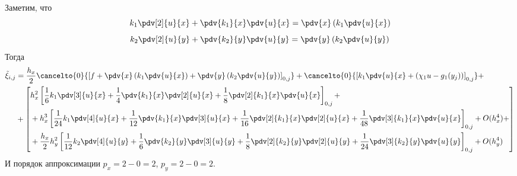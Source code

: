 Заметим, что
\[ k_1 \pdv[2]{u}{x} + \pdv{k_1}{x} \pdv{u}{x} = \pdv{x} \left( k_1 \pdv{u}{x} \right) \]
\[ k_2 \pdv[2]{u}{y} + \pdv{k_2}{y} \pdv{u}{y} = \pdv{y} \left( k_2 \pdv{u}{y} \right) \]
Тогда
\[
    \begin{split}
        \tilde{\xi}_{i,j} &= \frac{h_x}{2} \cancelto{0}{\left[ f + \pdv{x} \left( k_1 \pdv{u}{x} \right) + \pdv{y} \left( k_2 \pdv{u}{y} \right) \right]_{0,j}} + \cancelto{0}{\left[ k_1 \pdv{u}{x} + \left( \chi_1 u - g_1(y_{j}) \right) \right]_{0,j}} + \\
        &+ \left[
        \begin{aligned}
            & h_x^2 \left[ \frac{1}{6} k_1 \pdv[3]{u}{x} + \frac{1}{4} \pdv{k_1}{x} \pdv[2]{u}{x} + \frac{1}{8} \pdv[2]{k_1}{x} \pdv{u}{x} \right]_{0,j} + \\
            & + h_x^3 \left[ \frac{1}{24} k_1 \pdv[4]{u}{x} + \frac{1}{12} \pdv{k_1}{x} \pdv[3]{u}{x} + \frac{1}{16} \pdv[2]{k_1}{x} \pdv[2]{u}{x} + \frac{1}{48} \pdv[3]{k_1}{x} \pdv{u}{x} \right]_{0,j} + O(h_x^4) + \\
            & + \frac{h_x}{2} h_y^2 \left[ \frac{1}{12} k_2 \pdv[4]{u}{y} + \frac{1}{6} \pdv{k_2}{y} \pdv[3]{u}{y} + \frac{1}{8} \pdv[2]{k_2}{y} \pdv[2]{u}{y} + \frac{1}{24} \pdv[3]{k_2}{y} \pdv{u}{y} \right]_{0,j} + O(h_y^4)
        \end{aligned}
        \right]
    \end{split}
\]
И порядок аппроксимации $p_x = 2 - 0 = 2$, $p_y = 2 - 0 = 2$.

